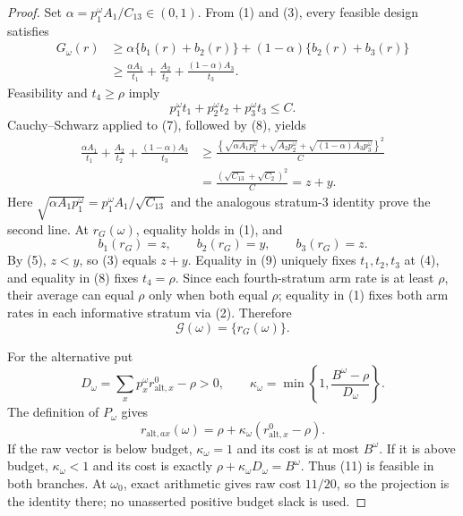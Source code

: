 \documentclass{article}
\begin{document}
\begin{proof}
Set \(\alpha=p_1^\omega A_1/C_{13}\in(0,1)\).  From (1) and (3), every feasible design satisfies
\[
 \begin{aligned}
 G_\omega(r)
 &\geq\alpha\{b_1(r)+b_2(r)\}+(1-\alpha)\{b_2(r)+b_3(r)\}\\
 &\geq\frac{\alpha A_1}{t_1}+\frac{A_2}{t_2}
       +\frac{(1-\alpha)A_3}{t_3}.                                  \tag{7}
 \end{aligned}
\]
Feasibility and \(t_4\geq\rho\) imply
\[
 p_1^\omega t_1+p_2^\omega t_2+p_3^\omega t_3\leq C.               \tag{8}
\]
Cauchy--Schwarz applied to (7), followed by (8), yields
\[
 \begin{aligned}
 \frac{\alpha A_1}{t_1}+\frac{A_2}{t_2}+
 \frac{(1-\alpha)A_3}{t_3}
 &\geq\frac{\left\{\sqrt{\alpha A_1p_1^\omega}+
 \sqrt{A_2p_2^\omega}+\sqrt{(1-\alpha)A_3p_3^\omega}\right\}^2}{C}\\
 &=\frac{(\sqrt{C_{13}}+\sqrt{C_2})^2}{C}=z+y.                     \tag{9}
 \end{aligned}
\]
Here \(\sqrt{\alpha A_1p_1^\omega}=p_1^\omega A_1/\sqrt{C_{13}}\) and the analogous stratum-\(3\) identity prove the second line.  At \(r_G(\omega)\), equality holds in (1), and
\[
 b_1(r_G)=z,\qquad b_2(r_G)=y,\qquad b_3(r_G)=z.
\]
By (5), \(z<y\), so (3) equals \(z+y\).  Equality in (9) uniquely fixes \(t_1,t_2,t_3\) at (4), and equality in (8) fixes \(t_4=\rho\).  Since each fourth-stratum arm rate is at least \(\rho\), their average can equal \(\rho\) only when both equal \(\rho\); equality in (1) fixes both arm rates in each informative stratum via (2).  Therefore
\[
 \mathcal G(\omega)=\{r_G(\omega)\}.                               \tag{10}
\]

For the alternative put
\[
 D_\omega=\sum_xp_x^\omega r^0_{\mathrm{alt},x}-\rho>0,\qquad
 \kappa_\omega=\min\left\{1,\frac{B^\omega-\rho}{D_\omega}\right\}.
\]
The definition of \(P_\omega\) gives
\[
 r_{\mathrm{alt},ax}(\omega)=\rho+\kappa_\omega
 (r^0_{\mathrm{alt},x}-\rho).                                      \tag{11}
\]
If the raw vector is below budget, \(\kappa_\omega=1\) and its cost is at most \(B^\omega\).  If it is above budget, \(\kappa_\omega<1\) and its cost is exactly \(\rho+\kappa_\omega D_\omega=B^\omega\).  Thus (11) is feasible in both branches.  At \(\omega_0\), exact arithmetic gives raw cost \(11/20\), so the projection is the identity there; no unasserted positive budget slack is used.


\end{proof}
\end{document}
